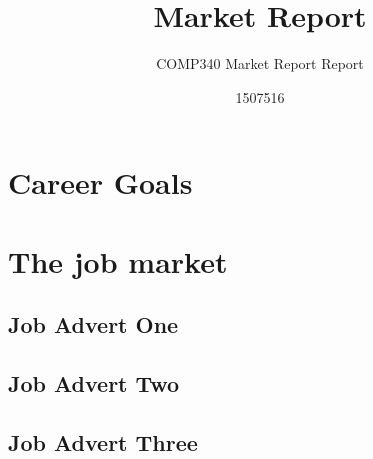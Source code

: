 \documentclass{scrartcl}
\title{Market Report}
\subtitle{COMP340 Market Report Report}
\author{1507516}
\begin{document}
\maketitle


\section{Career Goals}


\section{The job market}

\subsection{Job Advert One}

\subsection{Job Advert Two}

\subsection{Job Advert Three}


\end{document}
